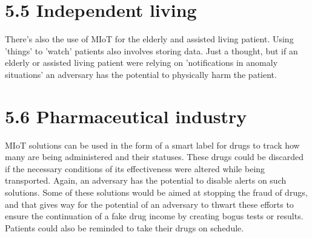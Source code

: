 
\section*{5.5 Independent living}
There's also the use of MIoT for the elderly and assisted living patient. Using 'things' to 'watch' patients also involves storing data. Just a thought, but if an elderly or assisted living patient were relying on 'notifications in anomaly situations' an adversary has the potential to physically harm the patient.

\section*{5.6 Pharmaceutical industry}
MIoT solutions can be used in the form of a smart label for drugs to track how many are being administered and their statuses. These drugs could be discarded if the necessary conditions of its effectiveness were altered while being transported. Again, an adversary has the potential to disable alerts on such solutions. Some of these solutions would be aimed at stopping the fraud of drugs, and that gives way for the potential of an adversary to thwart these efforts to ensure the continuation of a fake drug income by creating bogus tests or results. Patients could also be reminded to take their drugs on schedule.


